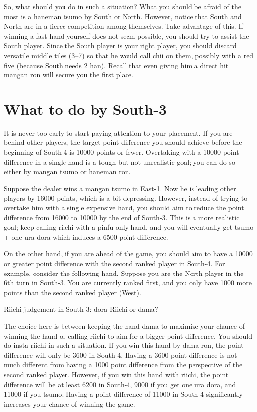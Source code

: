 \bigskip
So, what should you do in such a situation? 
What you should be afraid of the most is a {\jap haneman tsumo} by South or North. However, notice that South and North are in a fierce competition among themselves. Take advantage of this. If winning a fast hand yourself does not seem possible, you should try to assist the South player. Since the South player is your right player, you should discard versatile middle tiles (3--7) so that he would call {\jap chii} on them, possibly with a red five (because South needs 2 {\jap han}). Recall that even giving him a direct hit {\jap mangan ron} will secure you the first place. 

\section{What to do by South-3}
It is never too early to start paying attention to your placement. If you are behind other players, the target point difference you should achieve before the beginning of South-4 is 10000 points or fewer. Overtaking with a 10000 point difference in a single hand is a tough but not unrealistic goal; you can do so either by {\jap mangan tsumo} or {\jap haneman ron}. 

\bigskip
Suppose the dealer wins a {\jap mangan tsumo} in East-1. Now he is leading other players by 16000 points, which is a bit depressing. However, instead of trying to overtake him with a single expensive hand, you should aim to reduce the point difference from 16000 to 10000 by the end of South-3. This is a more realistic goal; keep calling riichi with a {\jap pinfu}-only hand, and you will eventually get {\jap tsumo} + one {\jap ura dora} which induces a 6500 point difference. 

\bigskip
On the other hand, if you are ahead of the game, you should aim to have a 10000 or greater point difference with the second ranked player in South-4. 
For example, consider the following hand. Suppose you are the North player in the 6th turn in South-3. You are currently ranked first, and you only have 1000 more points than the second ranked player (West). 

\bigskip
\begin{itembox}[r]{{\jap Riichi} judgement in South-3: {\jap dora} {\LARGE{}}}
\bp
{}\bei
\ep
\vspace{-10pt}
{\jap Riichi} or {\jap dama}?
\end{itembox}
\noindent The choice here is between keeping the hand {\jap dama} to maximize your chance of winning the hand or calling riichi to aim for a bigger point difference. 
You should do insta-riichi in such a situation. If you win this hand by {\jap dama ron}, the point difference will only be 3600 in South-4. Having a 3600 point difference is not much different from having a 1000 point difference from the perspective of the second ranked player. However, if you win this hand with riichi, the point difference will be at least 6200 in South-4, 9000 if you get one {\jap ura dora}, and 11000 if you {\jap tsumo}. Having a point difference of 11000 in South-4 significantly increases your chance of winning the game. 

